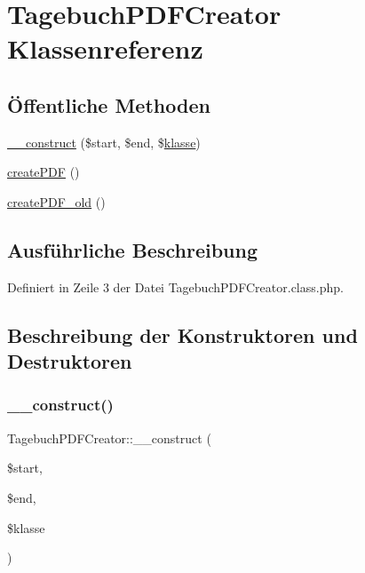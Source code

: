 \hypertarget{class_tagebuch_p_d_f_creator}{}\section{Tagebuch\+P\+D\+F\+Creator Klassenreferenz}
\label{class_tagebuch_p_d_f_creator}
\subsection*{Öffentliche Methoden}
\begin{DoxyCompactItemize}
\item 
\mbox{\hyperlink{class_tagebuch_p_d_f_creator_a4d971265cc671761240f5243a761c898}{\+\_\+\+\_\+construct}} (\$start, \$end, \$\mbox{\hyperlink{classklasse}{klasse}})
\item 
\mbox{\hyperlink{class_tagebuch_p_d_f_creator_ada4ccab4605f59c658edf6cc4fd3d5d4}{create\+P\+DF}} ()
\item 
\mbox{\hyperlink{class_tagebuch_p_d_f_creator_a62487e7b1b7c280978d4ef5cf2866b0d}{create\+P\+D\+F\+\_\+old}} ()
\end{DoxyCompactItemize}


\subsection{Ausführliche Beschreibung}


Definiert in Zeile 3 der Datei Tagebuch\+P\+D\+F\+Creator.\+class.\+php.



\subsection{Beschreibung der Konstruktoren und Destruktoren}
\mbox{\label{class_tagebuch_p_d_f_creator_a4d971265cc671761240f5243a761c898}} 
\subsubsection{\texorpdfstring{\+\_\+\+\_\+construct()}{\_\_construct()}}
{\footnotesize\ttfamily Tagebuch\+P\+D\+F\+Creator\+::\+\_\+\+\_\+construct (\begin{DoxyParamCaption}\item[{}]{\$start,  }\item[{}]{\$end,  }\item[{}]{\$klasse }\end{DoxyParamCaption})}


